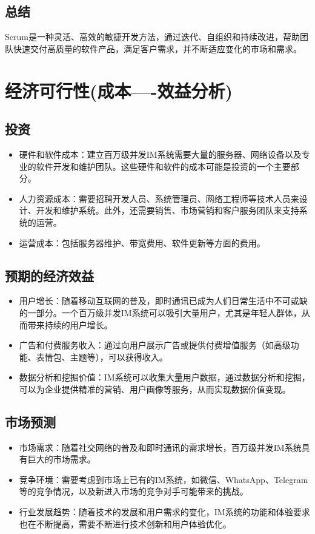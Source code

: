 \documentclass[12pt]{article}
\begin{document}
	\subsection{总结}
	Scrum是一种灵活、高效的敏捷开发方法，通过迭代、自组织和持续改进，帮助团队快速交付高质量的软件产品，满足客户需求，并不断适应变化的市场和需求。
	
	
	
	
	\section{经济可行性(成本----效益分析)}
	\subsection{投资}
	\begin{itemize}
		\item 硬件和软件成本：建立百万级并发IM系统需要大量的服务器、网络设备以及专业的软件开发和维护团队。这些硬件和软件的成本可能是投资的一个主要部分。
		\item 人力资源成本：需要招聘开发人员、系统管理员、网络工程师等技术人员来设计、开发和维护系统。此外，还需要销售、市场营销和客户服务团队来支持系统的运营。
		\item 运营成本：包括服务器维护、带宽费用、软件更新等方面的费用。
	\end{itemize}
	
	\subsection{预期的经济效益}
	\begin{itemize}
		\item 用户增长：随着移动互联网的普及，即时通讯已成为人们日常生活中不可或缺的一部分。一个百万级并发IM系统可以吸引大量用户，尤其是年轻人群体，从而带来持续的用户增长。
		\item 广告和付费服务收入：通过向用户展示广告或提供付费增值服务（如高级功能、表情包、主题等），可以获得收入。
		\item 数据分析和挖掘价值：IM系统可以收集大量用户数据，通过数据分析和挖掘，可以为企业提供精准的营销、用户画像等服务，从而实现数据价值变现。
	\end{itemize}
	\subsection{市场预测}
	\begin{itemize}
		\item 市场需求：随着社交网络的普及和即时通讯的需求增长，百万级并发IM系统具有巨大的市场需求。
		\item 竞争环境：需要考虑到市场上已有的IM系统，如微信、WhatsApp、Telegram等的竞争情况，以及新进入市场的竞争对手可能带来的挑战。
		\item 行业发展趋势：随着技术的发展和用户需求的变化，IM系统的功能和体验要求也在不断提高，需要不断进行技术创新和用户体验优化。
	\end{itemize}
\end{document}
